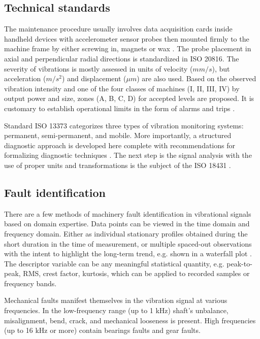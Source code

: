 \documentclass[11pt, a4paper, english]{article}
\begin{document}
\begin{refsection}
\subsection{Technical standards}
The maintenance procedure usually involves data acquisition cards inside handheld devices with accelerometer sensor probes then mounted firmly to the machine frame by either screwing in, magnets or wax \cite{ziaran_technicka_2013}. The probe placement in axial and perpendicular radial directions is standardized in ISO 20816. The severity of vibrations is mostly assessed in units of velocity ($mm/s$), but acceleration ($m/s^2$) and displacement ($\mu m$) are also used. Based on the observed vibration intensity and one of the four classes of machines (I, II, III, IV) by output power and size, zones (A, B, C, D) for accepted levels are proposed. It is customary to establish operational limits in the form of alarms and trips \cite{iso_20816}. 

Standard ISO 13373 categorizes three types of vibration monitoring systems: permanent, semi-permanent, and mobile. More importantly, a structured diagnostic approach is developed here complete with recommendations for formalizing diagnostic techniques \cite{iso_13373}. The next step is the signal analysis with the use of proper units and transformations is the subject of the ISO 18431 \cite{iso_18431}. 

\subsection{Fault identification}
There are a few methods of machinery fault identification in vibrational signals based on domain expertise. Data points can be viewed in the time domain and frequency domain. Either as individual stationary profiles obtained during the short duration in the time of measurement, or multiple spaced-out observations with the intent to highlight the long-term trend, e.g. shown in a waterfall plot \cite{ziaran_technicka_2013}. The descriptor variable can be any meaningful statistical quantity, e.g. peak-to-peak, RMS, crest factor, kurtosis, which can be applied to recorded samples or frequency bands.  

Mechanical faults manifest themselves in the vibration signal at various frequencies. In the low-frequency range (up to 1 kHz) shaft's unbalance, misalignment, bend, crack, and mechanical looseness is present. High frequencies (up to 16 kHz or more) contain bearings faults and gear faults. 


\end{refsection}
\end{document}
